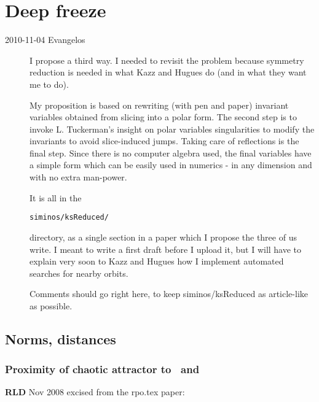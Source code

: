 
\chapter{Deep freeze}
\label{c-freeze}

\begin{description}

\item[2010-11-04 Evangelos]
I propose a third way. I needed to revisit the problem because symmetry
reduction is needed in what Kazz and Hugues do (and in what they want me
to do).

My proposition is based on rewriting (with pen and paper) invariant
variables obtained from slicing into a polar form. The second step is to
invoke L. Tuckerman's insight on polar variables singularities to modify
the invariants to avoid slice-induced jumps. Taking care of reflections
is the final step. Since there is no computer algebra used, the final
variables have a simple form which can be easily used in numerics - in
any dimension and with no extra man-power.

It is all in the
\begin{verbatim}
siminos/ksReduced/
\end{verbatim}
 directory, as a single section in a paper
which I propose the three of us write. I meant to write a first
draft before I upload it, but I will have to explain very soon to Kazz
and Hugues how I implement automated searches for nearby orbits.

Comments should go right here, to keep siminos/ksReduced as
article-like as possible.

\end{description}

\section{Norms, distances}

\subsection{Proximity of chaotic attractor to \eqva\ and \reqva}
\label{sec:proxeq}

{\bf RLD} Nov 2008  excised  from the rpo.tex paper:

